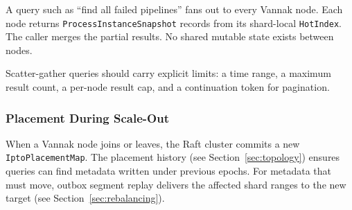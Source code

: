 A query such as ``find all failed pipelines'' fans out to every Vannak node.
Each node returns \texttt{ProcessInstanceSnapshot} records from its shard-local
\texttt{HotIndex}. The caller merges the partial results. No shared mutable
state exists between nodes.

Scatter-gather queries should carry explicit limits: a time range, a maximum
result count, a per-node result cap, and a continuation token for pagination.

\subsubsection{Placement During Scale-Out}

When a Vannak node joins or leaves, the Raft cluster commits a new
\texttt{IptoPlacementMap}. The placement history (see
Section~\ref{sec:topology}) ensures queries can find metadata written under
previous epochs. For metadata that must move, outbox segment replay delivers
the affected shard ranges to the new target (see Section~\ref{sec:rebalancing}).

\endinput

\subsection{Supervisor Control Access}

With \texttt{--raft}, the supervisor reads control snapshots through the leader's
linearizable read barrier and proposes checkpoints through the committed command
path. Followers forward requests to the leader. There is no fallback to locally
granted writer leases when quorum is unavailable. Initial leases are committed
deterministically at bootstrap and are not reassigned automatically after a
failure. The outbox node id must equal the Raft peer id.

The accept loop continues after idle polling timeouts. The election timeout is
3000 ms, above the active runtime's 750 ms heartbeat interval. Shutdown joins
Kafka and writer threads before stopping the Raft runtime.
